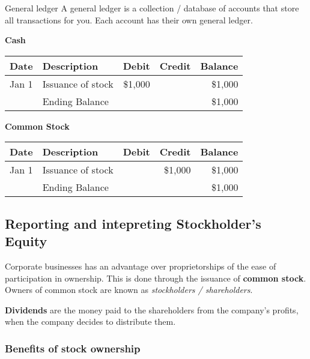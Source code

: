 \begin{definition}
    {General ledger}
    A general ledger is a collection / database of accounts that store all transactions for you. Each account has their own general ledger.
    \label{def:gl}
\end{definition}

\small
\begin{tcolorbox}[colframe=black,colback=white,title=Example General Ledger]
    \textbf{Cash} \\
    \begin{tabular}{llrrr}
        Date  & Description       & Debit   & Credit & Balance \\
        \hline
        Jan 1 & Issuance of stock & \$1,000 &        & \$1,000 \\
        \hline
              & Ending Balance    &         &        & \$1,000 \\
    \end{tabular}

    \vspace{0.5em}
    \textbf{Common Stock}\\
    \begin{tabular}{llrrr}
        Date  & Description       & Debit & Credit  & Balance \\
        \hline
        Jan 1 & Issuance of stock &       & \$1,000 & \$1,000 \\
        \hline
              & Ending Balance    &       &         & \$1,000 \\
    \end{tabular}
\end{tcolorbox}
\normalsize

\subsection{Reporting and intepreting Stockholder's Equity}
\label{subsec:stockholder}

Corporate businesses has an advantage over proprietorships of the ease of participation in ownership. This is done through the issuance of \textbf{common stock}. Owners of common stock are known as \textit{stockholders / shareholders}.

\textbf{Dividends} are the money paid to the shareholders from the company's profits, when the company decides to distribute them.

\subsubsection{Benefits of stock ownership}

